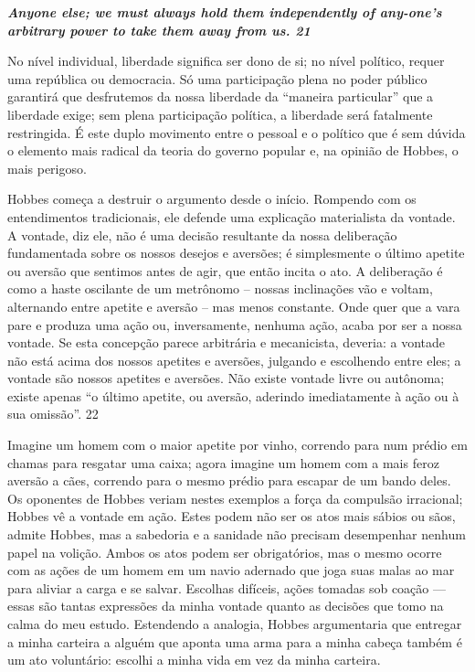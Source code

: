  
\par
 

 \textbf{\textit{Anyone else; we must always hold them independently of any-one’s arbitrary power to take them away from us. {{\color{blue} 21} } } }  
 
 
\par
 
No nível individual, liberdade significa ser dono de si; no nível político, requer uma república ou democracia. Só uma participação plena no poder público garantirá que desfrutemos da nossa liberdade da “maneira particular” que a liberdade exige; sem plena participação política, a liberdade será fatalmente restringida. É este duplo movimento entre o pessoal e o político que é sem dúvida o elemento mais radical da teoria do governo popular e, na opinião de Hobbes, o mais perigoso.
 
\par
 
Hobbes começa a destruir o argumento desde o início. Rompendo com os entendimentos tradicionais, ele defende uma explicação materialista da vontade. A vontade, diz ele, não é uma decisão resultante da nossa deliberação fundamentada sobre os nossos desejos e aversões; é simplesmente o último apetite ou aversão que sentimos antes de agir, que então incita o ato. A deliberação é como a haste oscilante de um metrônomo – nossas inclinações vão e voltam, alternando entre apetite e aversão – mas menos constante. Onde quer que a vara pare e produza uma ação ou, inversamente, nenhuma ação, acaba por ser a nossa vontade. Se esta concepção parece arbitrária e mecanicista, deveria: a vontade não está acima dos nossos apetites e aversões, julgando e escolhendo entre eles; a vontade são nossos apetites e aversões. Não existe vontade livre ou autônoma; existe apenas “o último apetite, ou aversão, aderindo imediatamente à ação ou à sua omissão”.
 {\color{blue} 22}  

 
\par
 
Imagine um homem com o maior apetite por vinho, correndo para num prédio em chamas para resgatar uma caixa; agora imagine um homem com a mais feroz aversão a cães, correndo para o mesmo prédio para escapar de um bando deles. Os oponentes de Hobbes veriam nestes exemplos a força da compulsão irracional; Hobbes vê a vontade em ação. Estes podem não ser os atos mais sábios ou sãos, admite Hobbes, mas a sabedoria e a sanidade não precisam desempenhar nenhum papel na volição. Ambos os atos podem ser obrigatórios, mas o mesmo ocorre com as ações de um homem em um navio adernado que joga suas malas ao mar para aliviar a carga e se salvar. Escolhas difíceis, ações tomadas sob coação — essas são tantas expressões da minha vontade quanto as decisões que tomo na calma do meu estudo. Estendendo a analogia, Hobbes argumentaria que entregar a minha carteira a alguém que aponta uma arma para a minha cabeça também é um ato voluntário: escolhi a minha vida em vez da minha carteira.
 
